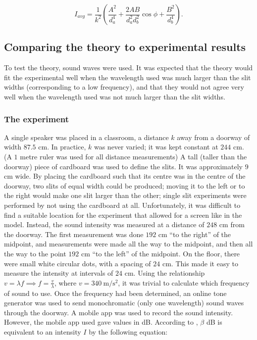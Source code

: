 \documentclass{paper}
\begin{document}
\begin{equation}
\label{eq:expression-for-average-intensity}
    I_{avg} = \frac{1}{k^2}\left(\frac{A^2}{d_a^4} + 
    \frac{2AB}{d_{a}^{2}d_{b}^{2}}\cos{\phi} + \frac{B^2}{d_b^4}\right).
\end{equation}

\subsection{Comparing the theory to experimental results}

To test the theory, sound waves were used. It was expected that the theory
would fit the experimental well when the wavelength used was much larger than
the slit widths (corresponding to a low frequency), and that they would not agree
very well when the wavelength used was not much larger than the slit widths.

                \subsubsection{The experiment}
                
A single speaker was placed in a classroom, a distance $k$ away from a doorway of width $87.5$ cm.
In practice, $k$ was never varied; it was kept constant at $244$ cm. (A $1$ metre ruler was used for all distance measurements) A tall (taller than the doorway) piece of cardboard was used to define the slits. It was approximately $9$ cm wide. By placing the
cardboard such that its centre was in the centre of the doorway, two slits of equal width could be
produced; moving it to the left or to the right would make one slit larger than the other;
single slit experiments were performed by not using the cardboard at all. Unfortunately, it was difficult
to find a suitable location for the experiment that allowed for a screen like in the model. Instead, the
sound intensity was measured at a distance of $248$ cm from the doorway. The first measurement was done
$192$ cm \enquote{to the right} of the midpoint, and measurements were made all the way to the midpoint,
and then all the way to the point $192$ cm \enquote{to the left} of the midpoint. On the floor, there were
small white circular dots, with a spacing of $24$ cm. This made it easy to measure the intensity at intervals
of $24$ cm. Using the relationship $v = \lambda{}f \implies f = \frac{v}{\lambda}$, where $v = \SI{340}{\m\per\square\s}$, 
it was trivial to calculate which frequency of sound to use. Once the frequency had been determined,
an online tone generator \parencite{tone-generator} was used to send monochromatic
(only one wavelength) sound waves through the doorway. A mobile app \parencite{sound-meter} was used to record the sound
intensity. However, the mobile app used gave values in dB. According to \parencite{decibel-to-intensity}, $\beta$ dB
is equivalent to an intensity $I$ by the following equation:
\end{document}
